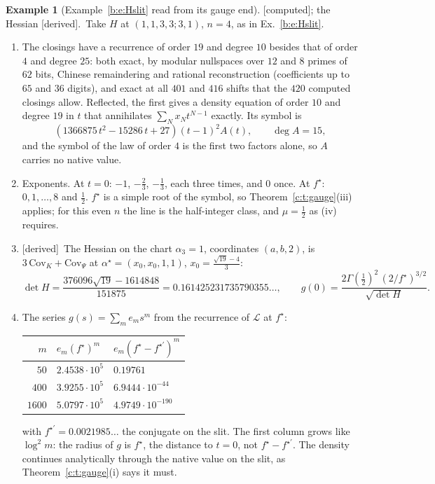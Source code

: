 \documentclass[11pt]{article}
\theoremstyle{plain}
\theoremstyle{definition}
\newtheorem{example}[proposition]{Example}
\theoremstyle{remark}
\newcommand{\derived}{\textup{[derived]}}
\newcommand{\computed}{\textup{[computed]}}
\begin{document}
\begin{example}[Example~\ref{b:e:Hslit} read from its gauge end]\label{c:e:slitgauge}\computed; the Hessian \derived.\
Take $H$ at $(1,1,3,3;3,1)$, $n=4$, as in Ex.~\ref{b:e:Hslit}.
\begin{enumerate}[label=(\roman*)]
\item The closings have a recurrence of order $19$ and degree $10$ besides that of order $4$ and degree $25$: both exact, by modular nullspaces over $12$ and $8$ primes of $62$ bits, Chinese remaindering and rational reconstruction (coefficients up to $65$ and $36$ digits), and exact at all $401$ and $416$ shifts that the $420$ computed closings allow. Reflected, the first gives a density equation of order $10$ and degree $19$ in $t$ that annihilates $\sum_Nx_Nt^{N-1}$ exactly. Its symbol is
\[
(1366875\,t^2-15286\,t+27)(t-1)^2A(t),\qquad\deg A=15,
\]
and the symbol of the law of order $4$ is the first two factors alone, so $A$ carries no native value.
\item Exponents. At $t=0$: $-1$, $-\frac23$, $-\frac13$, each three times, and $0$ once. At $f^\star$: $0,1,\dots,8$ and $\frac12$. $f^\star$ is a simple root of the symbol, so Theorem~\ref{c:t:gauge}(iii) applies; for this even $n$ the line is the half-integer class, and $\mu=\frac12$ as (iv) requires.
\item \derived\ The Hessian on the chart $\alpha_3=1$, coordinates $(a,b,2)$, is $3\,\mathrm{Cov}_K+\mathrm{Cov}_\Psi$ at $\alpha^\star=(x_0,x_0,1,1)$, $x_0=\frac{\sqrt{19}-4}3$:
\[
\det H=\frac{376096\sqrt{19}-1614848}{151875}=0.161425231735790355\ldots,\qquad g(0)=\frac{2\Gamma(\frac12)^2\,(2/f^\star)^{3/2}}{\sqrt{\det H}} .
\]
\item The series $g(s)=\sum_me_ms^m$ from the recurrence of $\mathcal L$ at $f^\star$:
\begin{center}
\small
\begin{tabular}{@{}r l l@{}}
\toprule
$m$ & $e_m(f^\star)^m$ & $e_m(f^\star-f^{\star\prime})^m$\\ \midrule
$50$ & $2.4538\cdot10^5$ & $0.19761$\\
$400$ & $3.9255\cdot10^5$ & $6.9444\cdot10^{-44}$\\
$1600$ & $5.0797\cdot10^5$ & $4.9749\cdot10^{-190}$\\
\bottomrule
\end{tabular}
\end{center}
with $f^{\star\prime}=0.0021985\ldots$ the conjugate on the slit. The first column grows like $\log^2m$: the radius of $g$ is $f^\star$, the distance to $t=0$, not $f^\star-f^{\star\prime}$. The density continues analytically through the native value on the slit, as Theorem~\ref{c:t:gauge}(i) says it must.

\end{enumerate}
\end{example}
\end{document}
